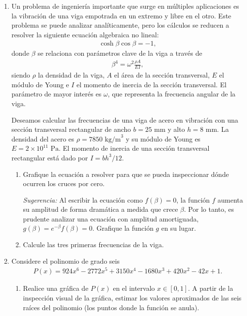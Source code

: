 \documentclass[12pt]{article}
\begin{document}
\begin{problemas}[]
\begin{enumerate}[leftmargin=*]
\item Un problema de ingeniería importante que surge en múltiples aplicaciones es la vibración de una viga empotrada en un extremo y libre en el otro. Este problema se puede analizar analíticamente, pero los cálculos se reducen a resolver la siguiente ecuación algebraica no lineal:
\begin{align*}
\cosh \beta \cos \beta = -1,
\end{align*}
donde $\beta$ se relaciona con parámetros clave de la viga a través de
\begin{align*}
\beta^4 = \omega^2 \frac{\rho A}{E I},
\end{align*}
siendo $\rho$ la densidad de la viga, $A$ el área de la sección transversal, $E$ el módulo de Young e $I$ el momento de inercia de la sección transversal. El parámetro de mayor interés es $\omega$, que representa la frecuencia angular de la viga.

Deseamos calcular las frecuencias de una viga de acero en vibración con una sección transversal rectangular de ancho $b = 25\text{ mm}$ y alto $h = 8\text{ mm}$. La densidad del acero es $\rho = 7850\text{ kg/m}^3$ y su módulo de Young es $E = 2 \times 10^{11}\text{ Pa}$. El momento de inercia de una sección transversal rectangular está dado por $I = bh^3 / 12$.

\begin{enumerate}
    \item[a)] Grafique la ecuación a resolver para que se pueda inspeccionar dónde ocurren los cruces por cero.
    
    \textit{Sugerencia:} Al escribir la ecuación como $f(\beta) = 0$, la función $f$ aumenta su amplitud de forma dramática a medida que crece $\beta$. Por lo tanto, es prudente analizar una ecuación con amplitud amortiguada, $g(\beta) = e^{-\beta} f(\beta) = 0$. Grafique la función $g$ en su lugar.

    \item[b)] Calcule las tres primeras frecuencias de la viga.
\end{enumerate}

\item Considere el polinomio de grado seis
%
\begin{align*}
   P(x) = 924x^6 - 2772x^5 + 3150x^4 - 1680x^3 + 420x^2 - 42x + 1.
\end{align*}
%
\begin{enumerate}[label=\alph*)]
   \item Realice una gráfica de $P(x)$ en el intervalo $x \in [0, 1]$. 
   A partir de la inspección visual de la gráfica, 
   estimar los valores aproximados de las seis raíces del polinomio 
   (los puntos donde la función se anula).
   

\end{enumerate}
\end{enumerate}
\end{problemas}
\end{document}
